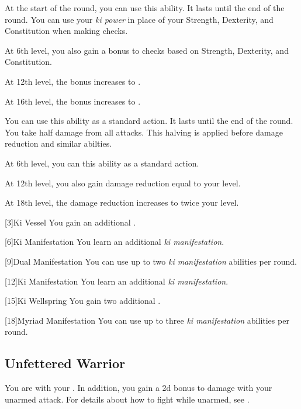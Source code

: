 {            
            At the start of the round, you can use this ability.
            It lasts until the end of the round.
            You can use your \textit{ki power} in place of your Strength, Dexterity, and Constitution when making checks.
            \par At 6th level, you also gain a  bonus to checks based on Strength, Dexterity, and Constitution.
            \par At 12th level, the bonus increases to .
            \par At 16th level, the bonus increases to .

            You can use this ability as a standard action.
            It lasts until the end of the round.
            You take half damage from all attacks.
            This halving is applied before damage reduction and similar abilties.
            \par At 6th level, you can  this ability as a standard action.
            \par At 12th level, you also gain damage reduction equal to your level.
            \par At 18th level, the damage reduction increases to twice your level.
        }

        [3]{Ki Vessel} You gain an additional .

        [6]{Ki Manifestation}
        You learn an additional \textit{ki manifestation}.

        [9]{Dual Manifestation} You can use up to two \textit{ki manifestation} abilities per round.

        [12]{Ki Manifestation}
        You learn an additional \textit{ki manifestation}.

        [15]{Ki Wellspring} You gain two additional .

        [18]{Myriad Manifestation} You can use up to three \textit{ki manifestation} abilities per round.

    \subsection{Unfettered Warrior}
        You are  with your .
        In addition, you gain a \plus2d bonus to damage with your unarmed attack.
        For details about how to fight while unarmed, see .

